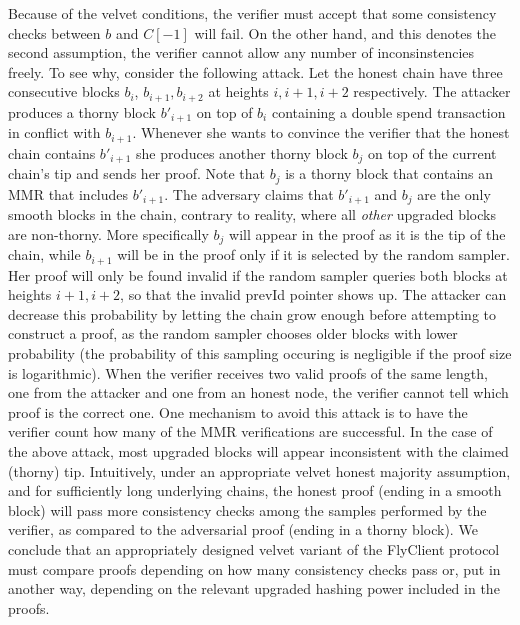 	Because of the velvet conditions, the verifier must accept that some consistency checks between $b$ and $C[-1]$ will fail.
	On the other hand, and this denotes the second assumption, the verifier cannot allow any number of inconsinstencies freely. To see why,
	consider the following attack. Let the honest chain have three consecutive blocks $b_i$, $b_{i+1}, b_{i+2}$ at heights $i, i+1, i+2$ respectively. The attacker 
	produces a thorny block $b'_{i+1}$ on top of $b_i$ containing a double spend transaction in conflict with $b_{i+1}$.
	Whenever she wants to convince the verifier that the honest chain contains $b'_{i+1}$ she produces another thorny block $b_j$ on top of the current chain's tip 
	and sends her proof. Note that $b_j$ is a thorny block that contains an MMR that includes
	$b'_{i+1}$. The adversary claims that $b'_{i+1}$ and $b_j$ are the only smooth blocks in the chain, contrary to reality, where all \emph{other} upgraded blocks 
	are non-thorny.
	More specifically $b_j$ will appear in the proof as it is the tip of the chain, while $b_{i+1}$ will be in the proof
	only if it is selected by the random sampler. Her proof will only be found invalid if the random sampler queries both blocks at heights $i+1, i+2$, so that 
	the invalid prevId pointer shows up. The attacker can decrease this probability
	by letting the chain grow enough before attempting to construct a proof, as the random sampler chooses older blocks with lower probability 
	(the probability of this sampling occuring is negligible if the proof size is logarithmic). 
	When the verifier receives two valid proofs of the same length, one from the attacker and one from an honest node,
	the verifier cannot tell which proof is the correct one. 
	One mechanism to avoid this attack is to have the verifier count how many of
	the MMR verifications are successful. In the case of the above attack, most upgraded blocks will appear inconsistent with the claimed (thorny) tip.
	Intuitively, under an appropriate velvet honest majority assumption, and for sufficiently long underlying chains, the honest proof (ending in a smooth block)
	will pass more consistency checks among the samples performed
	by the verifier, as compared to the adversarial proof (ending in a thorny block).
	We conclude that an appropriately designed velvet variant of the FlyClient protocol must compare proofs depending on how many
	consistency checks pass or, put in another way, depending on the relevant upgraded hashing power included in the proofs. 

